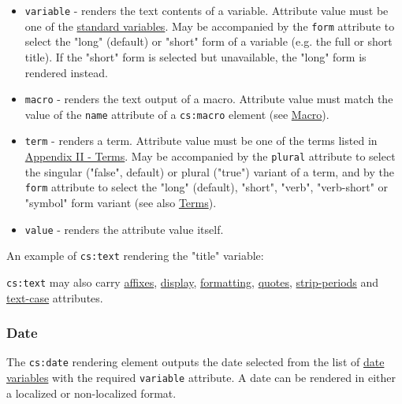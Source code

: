 \begin{itemize}
\tightlist
\item
  \texttt{variable} - renders the text contents of a variable. Attribute
  value must be one of the
  \protect\hyperlink{standard-variables}{standard variables}. May be
  accompanied by the \texttt{form} attribute to select the "long"
  (default) or "short" form of a variable (e.g. the full or short
  title). If the "short" form is selected but unavailable, the "long"
  form is rendered instead.
\item
  \texttt{macro} - renders the text output of a macro. Attribute value
  must match the value of the \texttt{name} attribute of a
  \texttt{cs:macro} element (see \protect\hyperlink{macro}{Macro}).
\item
  \texttt{term} - renders a term. Attribute value must be one of the
  terms listed in \protect\hyperlink{appendix-ii---terms}{Appendix II -
  Terms}. May be accompanied by the \texttt{plural} attribute to select
  the singular ("false", default) or plural ("true") variant of a term,
  and by the \texttt{form} attribute to select the "long" (default),
  "short", "verb", "verb-short" or "symbol" form variant (see also
  \protect\hyperlink{terms}{Terms}).
\item
  \texttt{value} - renders the attribute value itself.
\end{itemize}

An example of \texttt{cs:text} rendering the "title" variable:

\begin{Shaded}
\begin{Highlighting}[]
\NormalTok{\textless{}}\NormalTok{/\textgreater{}}
\end{Highlighting}
\end{Shaded}

\texttt{cs:text} may also carry \protect\hyperlink{affixes}{affixes},
\protect\hyperlink{display}{display},
\protect\hyperlink{formatting}{formatting},
\protect\hyperlink{quotes}{quotes},
\protect\hyperlink{strip-periods}{strip-periods} and
\protect\hyperlink{text-case}{text-case} attributes.

\hypertarget{date}{%
\subsubsection{Date}\label{date}}

The \texttt{cs:date} rendering element outputs the date selected from
the list of \protect\hyperlink{date-variables}{date variables} with the
required \texttt{variable} attribute. A date can be rendered in either a
localized or non-localized format.

